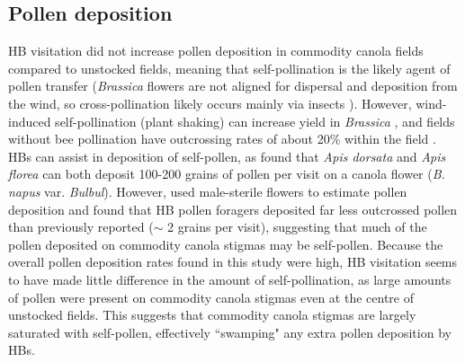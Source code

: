 \documentclass[12pt]{article} %
\begin{document}
\subsection*{Pollen deposition}
HB visitation did not increase pollen deposition in commodity canola fields compared to unstocked fields, meaning that self-pollination is the likely agent of pollen transfer (\emph{Brassica} flowers are not aligned for dispersal and deposition from the wind, so cross-pollination likely occurs mainly via insects \citep{mesquida1982,cresswell2004}).
However, wind-induced self-pollination (plant shaking) can increase yield in \textit{Brassica} \citep{williams1986, mesquida1988c}, and fields without bee pollination have outcrossing rates of about 20\% within the field \citep{rakow1987,becker1992}.
HBs can assist in deposition of self-pollen, as \citet{ali2011} found that \textit{Apis dorsata} and \textit{Apis florea} can both deposit 100-200 grains of pollen per visit on a canola flower (\emph{B. napus} var. \emph{Bulbul}).
However, \citet{waytes2022} used male-sterile flowers to estimate pollen deposition and found that HB pollen foragers deposited far less outcrossed pollen than previously reported ($\sim$ 2 grains per visit), suggesting that much of the pollen deposited on commodity canola stigmas may be self-pollen. 
Because the overall pollen deposition rates found in this study were high, HB visitation seems to have made little difference in the amount of self-pollination, as large amounts of pollen were present on commodity canola stigmas even at the centre of unstocked fields.
This suggests that commodity canola stigmas are largely saturated with self-pollen, effectively ``swamping" any extra pollen deposition by HBs.
\end{document}
